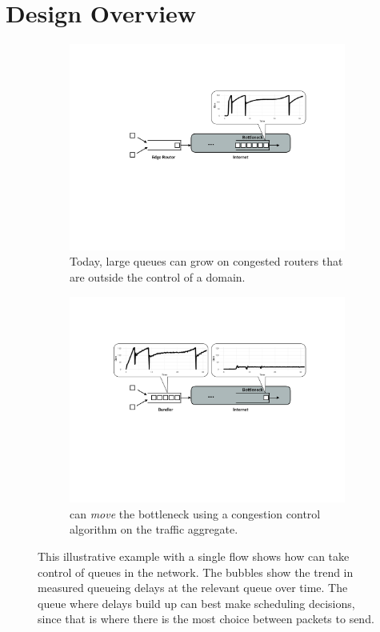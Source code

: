 \section{Design Overview}\label{s:design}
\begin{figure}
    \centering
    \begin{subfigure}[b]{0.5\textwidth}
        \includegraphics[width=\textwidth]{img/shift-bottleneck-before}
        \caption{Today, large queues can grow on congested routers that are outside the control of a domain.}\label{fig:design:shift-bottleneck:before}
    \end{subfigure}
    \begin{subfigure}[b]{0.5\textwidth}
        \includegraphics[width=\textwidth]{img/shift-bottleneck-after}
        \caption{\name can \emph{move} the bottleneck using a congestion control algorithm on the traffic aggregate.}\label{fig:design:shift-bottleneck:after}
    \end{subfigure}
    \caption{This illustrative example with a single flow shows how \name can take control of queues in the network. The bubbles show the trend in measured queueing delays at the relevant queue over time. The queue where delays build up can best make scheduling decisions, since that is where there is the most choice between packets to send.}\label{fig:design:shift-bottleneck}
\end{figure}

